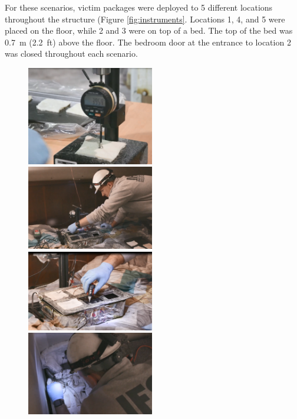\documentclass[12pt,oneside]{book}
\begin{document}
For these scenarios, victim packages were deployed to 5 different locations throughout the structure (Figure \ref{fig:instruments}.  Locations 1, 4, and 5 were placed on the floor, while 2 and 3 were on top of a bed. The top of the bed was 0.7~m (2.2~ft) above the floor.  The bedroom door at the entrance to location 2 was closed throughout each scenario.  


\begin{figure}[H]
\centering
\includegraphics[width=0.495\textwidth]{../0_Images/Instrumentation/Burn_Measurements/SBA_Measurment}
\includegraphics[width=0.495\textwidth]{../0_Images/Instrumentation/Burn_Measurements/SBA_Sub_TC_Attach}
\includegraphics[width=0.495\textwidth]{../0_Images/Instrumentation/Burn_Measurements/SBA_gluing}
\includegraphics[width=0.495\textwidth]{../0_Images/Instrumentation/Burn_Measurements/SBA_Sur_TC_Attach}

\end{figure}
\end{document}
